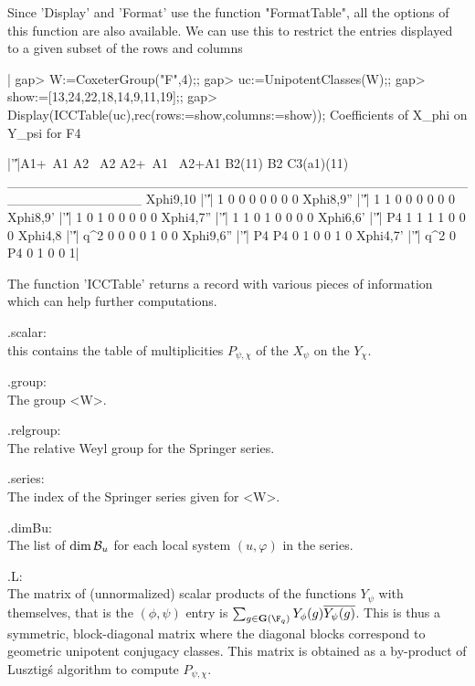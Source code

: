 Since  'Display'  and  'Format'  use  the  function  "FormatTable", all the
options  of this function are  also available. We can  use this to restrict
the entries displayed to a given subset of the rows and columns\:

|    gap> W:=CoxeterGroup("F",4);;
    gap> uc:=UnipotentClasses(W);;
    gap> show:=[13,24,22,18,14,9,11,19];;
    gap> Display(ICCTable(uc),rec(rows:=show,columns:=show));
    Coefficients of X_phi on Y_psi for F4
    
                |'\|'|A1+~A1 A2 ~A2 A2+~A1 ~A2+A1 B2(11) B2 C3(a1)(11)
    ______________________________________________________________
    Xphi{9,10}  |'\|'|     1  0   0      0      0      0  0          0
    Xphi{8,9}'' |'\|'|     1  1   0      0      0      0  0          0
    Xphi{8,9}'  |'\|'|     1  0   1      0      0      0  0          0
    Xphi{4,7}'' |'\|'|     1  1   0      1      0      0  0          0
    Xphi{6,6}'  |'\|'|    P4  1   1      1      1      0  0          0
    Xphi{4,8}   |'\|'|   q^2  0   0      0      0      1  0          0
    Xphi{9,6}'' |'\|'|    P4 P4   0      1      0      0  1          0
    Xphi{4,7}'  |'\|'|   q^2  0  P4      0      1      0  0          1|

The function 'ICCTable' returns a record with various pieces of information
which can help further computations.

.scalar:\\ this contains the table of multiplicities $P_{\psi,\chi}$ of the
$X_\psi$ on the $Y_\chi$.

.group:\\ The group <W>.

.relgroup:\\ The relative Weyl group for the Springer series.

.series:\\ The index of the Springer series given for <W>.

.dimBu:\\  The list of  $\dim{\mathcal B}_u$ for each  local system $(u,\varphi)$ in
the series.

.L:\\  The  matrix  of  (unnormalized)  scalar  products  of  the functions
$Y_\psi$   with   themselves,   that   is   the   $(\phi,\psi)$   entry  is
$\sum_{g\in\bG(\F_q)}  Y_\phi(g)  \overline{Y_\psi(g)}$.  This  is  thus  a
symmetric,  block-diagonal matrix  where the  diagonal blocks correspond to
geometric  unipotent  conjugacy  classes.  This  matrix  is  obtained  as a
by-product of Lusztig\'s algorithm to compute $P_{\psi,\chi}$.

%
%
%
%

